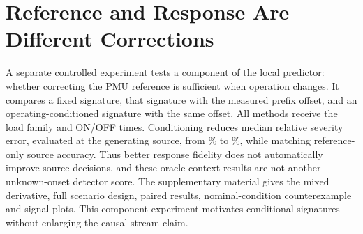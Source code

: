 \section{Reference and Response Are Different Corrections}
\label{sec:ei-x02}

A separate controlled experiment tests a component of the local predictor:
whether correcting the PMU reference is sufficient when operation changes.
It compares a fixed signature, that signature with the measured prefix
offset, and an operating-conditioned signature with the same offset.
All methods receive the load family and ON/OFF times. Conditioning reduces
median relative severity error, evaluated at the generating source, from
\EIRecentSeverity{}\% to \EICondSeverity{}\%, while matching reference-only
source accuracy. Thus better response fidelity does not automatically
improve source decisions, and these oracle-context results are not another
unknown-onset detector score. The supplementary material gives the mixed
derivative, full scenario design, paired results, nominal-condition
counterexample and signal plots. This component experiment motivates
conditional signatures without enlarging the causal stream claim.